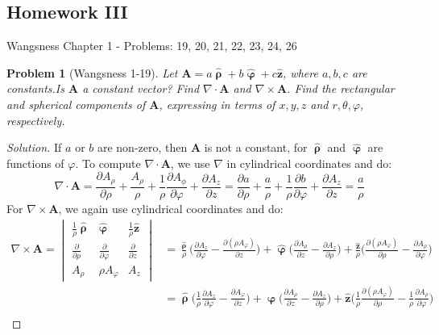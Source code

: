 \documentclass{article}
\theoremstyle{mystyle}
\newtheorem{problem}{Problem}[section]
\begin{document}
\subsection{Homework III}
Wangsness Chapter 1 - Problems: 19, 20, 21, 22, 23, 24, 26
\begin{problem}[Wangsness 1-19]
Let $\mathbf{A} = a\hat{\boldsymbol{\uprho}}+b\hat{\boldsymbol{\upvarphi}}+c\hat{\mathbf{z}}$, where $a,b,c$ are constants.Is $\mathbf{A}$ a constant vector? Find $\nabla\cdot \mathbf{A}$ and $\nabla\times \mathbf{A}$. Find the rectangular and spherical components of $\mathbf{A}$, expressing in terms of $x,y,z$ and $r,\theta,\varphi$, respectively.
\end{problem}
\begin{proof}[Solution]
If $a$ or $b$ are non-zero, then $\mathbf{A}$ is not a constant, for $\hat{\boldsymbol{\uprho}}$ and $\hat{\boldsymbol{\upvarphi}}$ are functions of $\varphi$. To compute $\nabla \cdot \mathbf{A}$, we use $\nabla$ in cylindrical coordinates and do:
\begin{equation*}
    \nabla\cdot\mathbf{A}=\frac{\partial A_{\rho}}{\partial \rho}+\frac{A_{\rho}}{\rho}+\frac{1}{\rho}\frac{\partial A_{\phi}}{\partial\varphi}+\frac{\partial A_{z}}{\partial z}=\frac{\partial a}{\partial\rho}+\frac{a}{\rho}+\frac{1}{\rho}\frac{\partial b}{\partial\varphi}+\frac{\partial A_{z}}{\partial z}=\frac{a}{\rho}
\end{equation*}
For $\nabla\times\mathbf{A}$, we again use cylindrical coordinates and do:
\begin{align*}
    \nabla \times \mathbf{A} = \begin{vmatrix} \frac{1}{\rho}\hat{\boldsymbol{\uprho}}& \hat{\boldsymbol{\upvarphi}} & \frac{1}{\rho}\hat{\mathbf{z}} \\ \frac{\partial}{\partial \rho} & \frac{\partial}{\partial \varphi} & \frac{\partial}{\partial z} \\ A_{\rho} &  \rho A_{\varphi} & A_z \end{vmatrix}&= \frac{\hat{\boldsymbol{\uprho}}}{\rho}\bigg(\frac{\partial A_{z}}{\partial \varphi} - \frac{\partial (\rho A_{\varphi})}{\partial z}\bigg) + \hat{\boldsymbol{\upvarphi}}\bigg(\frac{\partial A_{\rho}}{\partial z} - \frac{\partial A_{z}}{\partial \rho}\bigg) + \frac{\hat{\mathbf{z}}}{\rho}\bigg(\frac{\partial (\rho A_{\varphi})}{\partial \rho} - \frac{\partial A_{\rho}}{\partial \varphi}\bigg)\\
    &=\hat{\boldsymbol{\uprho}}\bigg(\frac{1}{\rho}\frac{\partial A_{z}}{\partial\varphi}-\frac{\partial A_{\varphi}}{\partial z}\bigg)+\hat{\boldsymbol{\upvarphi}}\bigg(\frac{\partial A_{\rho}}{\partial z}-\frac{\partial A_{z}}{\partial \rho}\bigg)+\hat{\mathbf{z}}\bigg(\frac{1}{\rho}\frac{\partial (\rho A_{\varphi})}{\partial\rho}-\frac{1}{\rho}\frac{\partial A_{\rho}}{\partial \varphi}\bigg)\\

\end{align*}
\end{proof}
\end{document}
